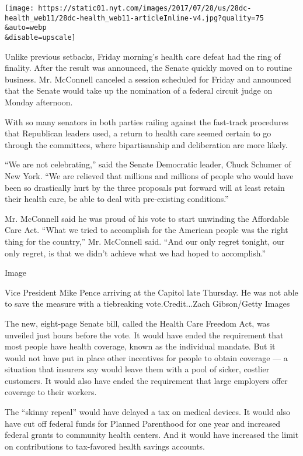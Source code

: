 \texttt{[image: https://static01.nyt.com/images/2017/07/28/us/28dc-health\_web11/28dc-health\_web11-articleInline-v4.jpg?quality=75\\\&auto=webp\\\&disable=upscale]}

Unlike previous setbacks, Friday morning's health care defeat had the
ring of finality. After the result was announced, the Senate quickly
moved on to routine business. Mr. McConnell canceled a session scheduled
for Friday and announced that the Senate would take up the nomination of
a federal circuit judge on Monday afternoon.

With so many senators in both parties railing against the fast-track
procedures that Republican leaders used, a return to health care seemed
certain to go through the committees, where bipartisanship and
deliberation are more likely.

``We are not celebrating,'' said the Senate Democratic leader, Chuck
Schumer of New York. ``We are relieved that millions and millions of
people who would have been so drastically hurt by the three proposals
put forward will at least retain their health care, be able to deal with
pre-existing conditions.''

Mr. McConnell said he was proud of his vote to start unwinding the
Affordable Care Act. ``What we tried to accomplish for the American
people was the right thing for the country,'' Mr. McConnell said. ``And
our only regret tonight, our only regret, is that we didn't achieve what
we had hoped to accomplish.''

Image

Vice President Mike Pence arriving at the Capitol late Thursday. He was
not able to save the measure with a tiebreaking vote.Credit...Zach
Gibson/Getty Images

The new, eight-page Senate bill, called the Health Care Freedom Act, was
unveiled just hours before the vote. It would have ended the requirement
that most people have health coverage, known as the individual mandate.
But it would not have put in place other incentives for people to obtain
coverage --- a situation that insurers say would leave them with a pool
of sicker, costlier customers. It would also have ended the requirement
that large employers offer coverage to their workers.

The ``skinny repeal'' would have delayed a tax on medical devices. It
would also have cut off federal funds for Planned Parenthood for one
year and increased federal grants to community health centers. And it
would have increased the limit on contributions to tax-favored health
savings accounts.

